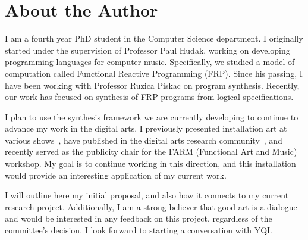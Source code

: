 \section{About the Author}

I am a fourth year PhD student in the Computer Science department.
I originally started under the supervision of Professor Paul Hudak, working on developing programming languages for computer music.
Specifically, we studied a model of computation called Functional Reactive Programming (FRP).
Since his passing, I have been working with Professor Ruzica Piskac on program synthesis.
Recently, our work has focused on synthesis of FRP programs from logical specifications.

I plan to use the synthesis framework we are currently developing to continue to advance my work in the digital arts.
I previously presented installation art at various shows~\cite{GLSArt,isosteeple}, have published in the digital arts research community~\cite{ICMC2015, FARM2015}, and recently served as the publicity chair for the FARM (Functional Art and Music) workshop.
My goal is to continue working in this direction, and this installation would provide an interesting application of my current work.

I will outline here my initial proposal, and also how it connects to my current research project.
Additionally, I am a strong believer that good art is a dialogue and would be interested in any feedback on this project, regardless of the committee's decision.
I look forward to starting a conversation with YQI.
